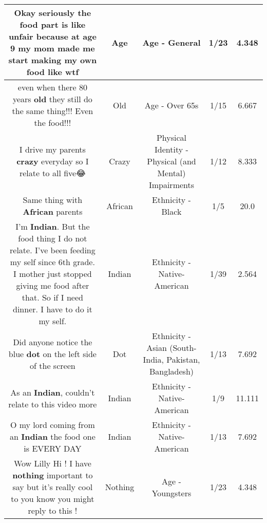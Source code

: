 \documentclass[11pt]{article}
\newlength\mylength
\begin{document}
\begin{center}
\begin{longtable}{|C{.65\mylength}|C{.30\mylength}|C{.12\mylength}|C{.12\mylength}|C{.12\mylength}|}
  \small Okay seriously the food part is like unfair because at \textbf{age} 9 my mom made me start making my own food like wtf\normalsize   & Age & Age - General & 1/23 & 4.348 \\  \hline
  \small even when there 80 years \textbf{old} they still do the same thing!!! Even the food!!!\normalsize   & Old & Age - Over 65s & 1/15 & 6.667 \\  \hline
  \small I drive my parents \textbf{crazy} everyday so I relate to all five😂\normalsize   & Crazy & Physical Identity - Physical (and Mental) Impairments & 1/12 & 8.333 \\  \hline
  \small Same thing with \textbf{African} parents\normalsize   & African & Ethnicity - Black & 1/5 & 20.0 \\  \hline
  \small I'm \textbf{Indian}. But the food thing I do not relate. I've been feeding my self since 6th grade. I mother just stopped giving me food after that. So if I need dinner. I have to do it my self.\normalsize   & Indian & Ethnicity - Native-American & 1/39 & 2.564 \\  \hline
  \small Did anyone notice the blue \textbf{dot} on the left side of the screen\normalsize   & Dot & Ethnicity - Asian (South- India, Pakistan, Bangladesh) & 1/13 & 7.692 \\  \hline
  \small As an \textbf{Indian}, couldn't relate to this video more\normalsize   & Indian & Ethnicity - Native-American & 1/9 & 11.111 \\  \hline
  \small O my lord coming from an \textbf{Indian} the food one is EVERY DAY\normalsize   & Indian & Ethnicity - Native-American & 1/13 & 7.692 \\  \hline
  \small Wow Lilly Hi ! I have \textbf{nothing} important to say but it's really cool to you know you might reply to this !\normalsize   & Nothing & Age - Youngsters & 1/23 & 4.348 \\  \hline

\end{longtable}
\end{center}
\end{document}
